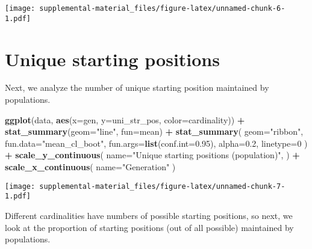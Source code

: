 \documentclass[]{book}
\newenvironment{Shaded}{\begin{snugshade}}{\end{snugshade}}
\newcommand{\DataTypeTok}[1]{\textcolor[rgb]{0.13,0.29,0.53}{#1}}
\newcommand{\DecValTok}[1]{\textcolor[rgb]{0.00,0.00,0.81}{#1}}
\newcommand{\FloatTok}[1]{\textcolor[rgb]{0.00,0.00,0.81}{#1}}
\newcommand{\KeywordTok}[1]{\textcolor[rgb]{0.13,0.29,0.53}{\textbf{#1}}}
\newcommand{\NormalTok}[1]{#1}
\newcommand{\OperatorTok}[1]{\textcolor[rgb]{0.81,0.36,0.00}{\textbf{#1}}}
\newcommand{\StringTok}[1]{\textcolor[rgb]{0.31,0.60,0.02}{#1}}
\begin{document}
\texttt{[image: supplemental-material\_files/figure-latex/unnamed-chunk-6-1.pdf]}

\hypertarget{unique-starting-positions}{%
\section{Unique starting positions}\label{unique-starting-positions}}

Next, we analyze the number of unique starting position maintained by populations.

\begin{Shaded}
\begin{Highlighting}[]
\KeywordTok{ggplot}\NormalTok{(data, }\KeywordTok{aes}\NormalTok{(}\DataTypeTok{x=}\NormalTok{gen, }\DataTypeTok{y=}\NormalTok{uni_str_pos, }\DataTypeTok{color=}\NormalTok{cardinality)) }\OperatorTok{+}
\StringTok{  }\KeywordTok{stat_summary}\NormalTok{(}\DataTypeTok{geom=}\StringTok{"line"}\NormalTok{, }\DataTypeTok{fun=}\NormalTok{mean) }\OperatorTok{+}
\StringTok{  }\KeywordTok{stat_summary}\NormalTok{(}
    \DataTypeTok{geom=}\StringTok{"ribbon"}\NormalTok{,}
    \DataTypeTok{fun.data=}\StringTok{"mean_cl_boot"}\NormalTok{,}
    \DataTypeTok{fun.args=}\KeywordTok{list}\NormalTok{(}\DataTypeTok{conf.int=}\FloatTok{0.95}\NormalTok{),}
    \DataTypeTok{alpha=}\FloatTok{0.2}\NormalTok{,}
    \DataTypeTok{linetype=}\DecValTok{0}
\NormalTok{  ) }\OperatorTok{+}
\StringTok{  }\KeywordTok{scale_y_continuous}\NormalTok{(}
    \DataTypeTok{name=}\StringTok{"Unique starting positions (population)"}\NormalTok{,}
\NormalTok{  ) }\OperatorTok{+}
\StringTok{  }\KeywordTok{scale_x_continuous}\NormalTok{(}
    \DataTypeTok{name=}\StringTok{"Generation"}
\NormalTok{  )}
\end{Highlighting}
\end{Shaded}

\texttt{[image: supplemental-material\_files/figure-latex/unnamed-chunk-7-1.pdf]}

Different cardinalities have numbers of possible starting positions, so next, we look at the proportion of starting positions (out of all possible) maintained by populations.
\end{document}
